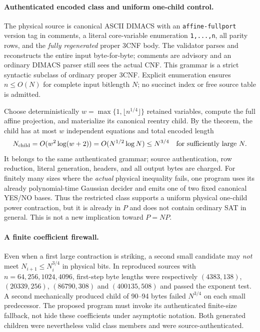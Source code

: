 \documentclass[11pt]{article}
\begin{document}
\paragraph{Authenticated encoded class and uniform one-child control.}
The physical source is canonical ASCII DIMACS with an \texttt{affine-fullport} version tag in comments, a literal core-variable enumeration \texttt{1,...,n}, all parity rows, and the \emph{fully regenerated} proper 3CNF body. The validator parses and reconstructs the entire input byte-for-byte; comments are advisory and an ordinary DIMACS parser still sees the actual CNF. This grammar is a strict syntactic subclass of ordinary proper 3CNF. Explicit enumeration ensures $n\le O(N)$ for complete input bitlength $N$; no succinct index or free source table is admitted.

Choose deterministically $w=\max\{1,\lfloor n^{1/4}\rfloor\}$ retained variables, compute the full affine projection, and materialize its canonical reentry child. By the theorem, the child has at most $w$ independent equations and total encoded length
\[
N_{\rm child}=O(w^2\log(w+2))=O(N^{1/2}\log N)
\le N^{3/4}\quad\text{for sufficiently large }N.
\]
It belongs to the same authenticated grammar; source authentication, row reduction, literal generation, headers, and all output bytes are charged. For finitely many sizes where the \emph{actual} physical inequality fails, one program uses its already polynomial-time Gaussian decider and emits one of two fixed canonical YES/NO bases. Thus the restricted class supports a uniform physical one-child power contraction, but it is already in $P$ and does not contain ordinary SAT in general. This is not a new implication toward $P=NP$.

\paragraph{A finite coefficient firewall.}
Even when a first large contraction is striking, a second small candidate may \emph{not} meet $N_{i+1}\le N_i^{3/4}$ in physical bits. In reproduced sources with $n=64,256,1024,4096$, first-step byte lengths were respectively $(4383,138)$, $(20339,256)$, $(86790,308)$ and $(400135,508)$ and passed the exponent test. A second mechanically produced child of 90--94 bytes failed $N^{3/4}$ on each small predecessor. The proposed program must invoke its authenticated finite-size fallback, not hide these coefficients under asymptotic notation. Both generated children were nevertheless valid class members and were source-authenticated.
\end{document}
